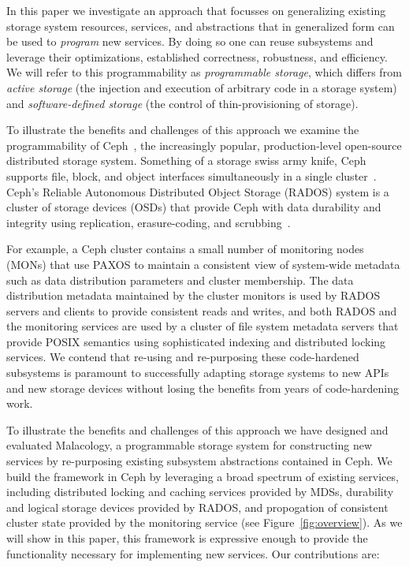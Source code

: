 \documentclass[10pt,twocolumn]{article}
\begin{document}
In this paper we investigate an approach that focusses on generalizing
existing storage system resources, services, and abstractions that in
generalized form can be used to \emph{program} new services. By doing so
one can reuse subsystems and leverage their optimizations,
established correctness, robustness, and efficiency. We will refer to
this programmability as \emph{programmable storage}, which differs from
\emph{active storage} (the injection and execution of arbitrary code in
a storage system) and \emph{software-defined storage} (the control of
thin-provisioning of storage).

To illustrate the benefits and challenges of this approach we examine
the programmability of Ceph~\cite{weil:osdi2006-ceph,ceph}, the increasingly
popular, production-level open-source distributed storage system.
Something of a storage swiss army knife, Ceph supports file, block, and
object interfaces simultaneously in a single cluster~\cite{ceph_contributors_ceph_2010}. Ceph's Reliable Autonomous 
Distributed Object Storage (RADOS) system is a cluster of storage
devices (OSDs) that provide Ceph with data durability and integrity
using replication, erasure-coding, and scrubbing~\cite{weil_rados_2007}. 


For example, a Ceph cluster contains a small number of
monitoring nodes (MONs) that use PAXOS to maintain a consistent view of
system-wide metadata such as data distribution parameters and cluster
membership. The data distribution metadata maintained by
the cluster monitors is used by RADOS servers and clients to provide
consistent reads and writes, and both RADOS and the monitoring services
are used by a cluster of file system metadata servers that provide POSIX
semantics using sophisticated indexing and distributed locking services.
We contend that re-using and re-purposing these code-hardened subsystems
is paramount to successfully adapting storage systems to new APIs and
new storage devices without losing the benefits from years of
code-hardening work.

To illustrate the benefits and challenges of this approach we have
designed and evaluated Malacology, a programmable storage system for
constructing new services by re-purposing existing subsystem
abstractions contained in Ceph. We build the framework in Ceph by
leveraging a broad spectrum of existing services, including distributed
locking and caching services provided by MDSs, durability and logical
storage devices provided by RADOS, and propogation of consistent cluster
state provided by the monitoring service (see Figure~\ref{fig:overview}). As we will show in this paper, this framework is expressive enough to provide the
functionality necessary for implementing new services. Our contributions
are:
\end{document}
